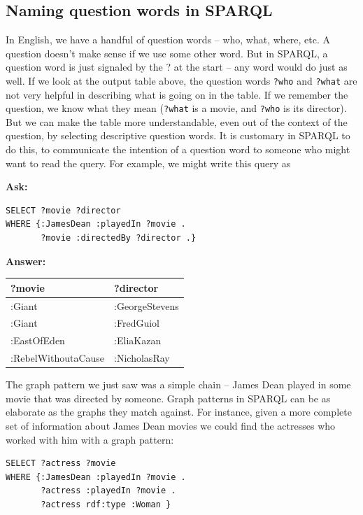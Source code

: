 \subsection{Naming question words in SPARQL}

In English, we have a handful of question words -- who, what, where,
etc. A question doesn't make sense if we use some other word. But in
SPARQL, a question word is just signaled by the ? at the start -- any
word would do just as well. If we look at the output table above, the
question words \texttt{?who} and \texttt{?what} are not very helpful in describing what is
going on in the table. If we remember the question, we know what they
mean (\texttt{?what} is a movie, and \texttt{?who} is its director). But we can make the
table more understandable, even out of the context of the question, by
selecting descriptive question words. It is customary in SPARQL to do
this, to communicate the intention of a question word to someone who
might want to read the query. For example, we might write this query as

\textbf{\textbf{Ask:}}

\begin{lstlisting}
SELECT ?movie ?director
WHERE {:JamesDean :playedIn ?movie .
       ?movie :directedBy ?director .}
\end{lstlisting}

\textbf{\textbf{Answer:}}

\begin{tabular}{|ll|}
\hline
?movie&?director\\
\hline
:Giant&:GeorgeStevens\\
:Giant&:FredGuiol\\
:EastOfEden&:EliaKazan\\
:RebelWithoutaCause&:NicholasRay\\
\hline
\end{tabular}

The graph pattern we just saw was a simple chain -- James Dean played in
some movie that was directed by someone. Graph patterns in SPARQL can be
as elaborate as the graphs they match against. For instance, given a
more complete set of information about James Dean movies we could find
the actresses who worked with him with a graph pattern:


\begin{lstlisting}
SELECT ?actress ?movie
WHERE {:JamesDean :playedIn ?movie .
       ?actress :playedIn ?movie .
       ?actress rdf:type :Woman }
\end{lstlisting}

